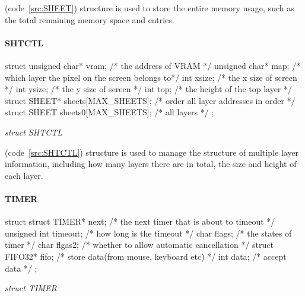 \documentclass{swfcthesis}
\begin{document}
(code~\ref{src:SHEET}) structure is used to store the entire memory usage, such as the
total remaining memory space and entries.



\paragraph{SHTCTL}

\begin{listing}[H]
  \begin{codeblock}
\begin{ccode}
struct 
{ 
  unsigned char* vram;              /* the address of VRAM */
  unsigned char* map;               /* which layer the pixel on the screen belongs to*/
  int xsize;                        /* the x size of screen */
  int ysize;                        /* the y size of screen */
  int top;                          /* the height of the top layer */
  struct SHEET* sheets[MAX_SHEETS]; /* order all layer addresses in order */
  struct SHEET sheets0[MAX_SHEETS]; /* all layers */
};
\end{ccode}
  \end{codeblock}
  \caption{\emph{struct SHTCTL}}\label{src:SHTCTL}
\end{listing}

(code~\ref{src:SHTCTL}) structure is used to manage the structure of multiple layer information,
including how many layers there are in total, the size and height of each layer.



\paragraph{TIMER}

\begin{listing}[H]
  \begin{codeblock}
\begin{ccode}
struct 
{ 
  struct TIMER* next;   /* the next timer that is about to timeout */
  unsigned int timeout; /* how long is the timeout */
  char flags;           /* the states of timer */
  char flgas2;          /* whether to allow automatic cancellation */
  struct FIFO32* fifo;  /* store data(from mouse, keyboard etc) */
  int data;             /* accept data */
};
\end{ccode}
  \end{codeblock}
  \caption{\emph{struct TIMER}}\label{src:TIMER}
\end{listing}
\end{document}
